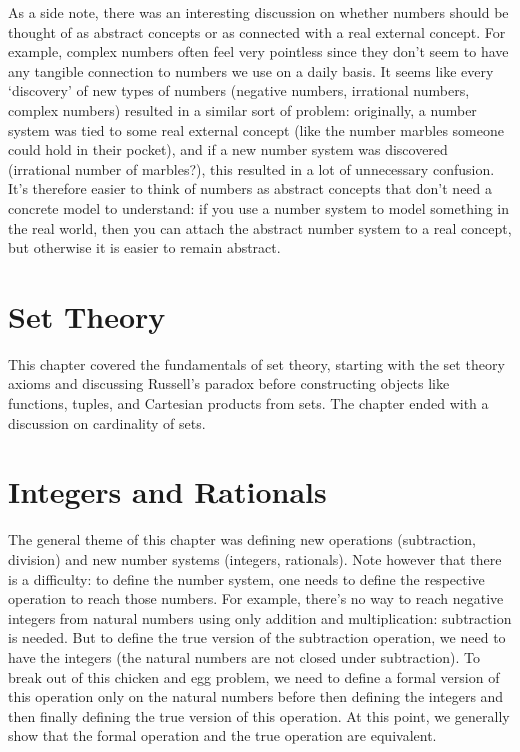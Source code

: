 \documentclass[answers,12pt]{exam}
\begin{document}
As a side note, there was an interesting discussion on whether numbers should be thought of as abstract concepts or as connected with a real external concept.
For example, complex numbers often feel very pointless since they don't seem to have any tangible connection to numbers we use on a daily basis.
It seems like every `discovery' of new types of numbers (negative numbers, irrational numbers, complex numbers) resulted in a similar sort of problem:
originally, a number system was tied to some real external concept (like the number marbles someone could hold in their pocket), and if a new number system was discovered (irrational number of marbles?), this resulted in a lot of unnecessary confusion.
It's therefore easier to think of numbers as abstract concepts that don't need a concrete model to understand:
if you use a number system to model something in the real world, then you can attach the abstract number system to a real concept, but otherwise it is easier to remain abstract.

\section{Set Theory}
This chapter covered the fundamentals of set theory, starting with the set theory axioms and discussing Russell's paradox before constructing objects like functions, tuples, and Cartesian products from sets.
The chapter ended with a discussion on cardinality of sets.

\section{Integers and Rationals}
The general theme of this chapter was defining new operations (subtraction, division) and new number systems (integers, rationals).
Note however that there is a difficulty: to define the number system, one needs to define the respective operation to reach those numbers. 
For example, there's no way to reach negative integers from natural numbers using only addition and multiplication: subtraction is needed. 
But to define the true version of the subtraction operation, we need to have the integers (the natural numbers are not closed under subtraction).
To break out of this chicken and egg problem, we need to define a formal version of this operation only on the natural numbers before then defining the integers and then finally defining the true version of this operation.
At this point, we generally show that the formal operation and the true operation are equivalent.
\end{document}
